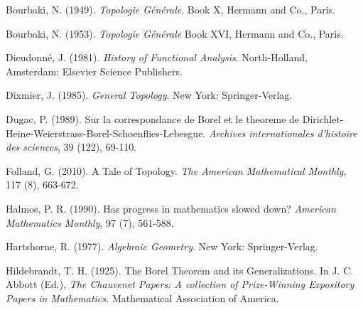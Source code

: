 \documentclass[12pt]{article}
\begin{document}
\begin{thebibliography}{99}
 Bourbaki, N. (1949). {\em Topologie G\'{e}n\'{e}rale}. Book X, Hermann and Co., Paris.

 Bourbaki, N. (1953). {\em Topologie G\'{e}n\'{e}rale} Book XVI, Hermann and Co., Paris.


 Dieudonn\'{e}, J. (1981). {\em  History of Functional Analysis}.
North-Holland, Amsterdam: Elsevier Science Publishers.


 Dixmier, J. (1985). {\em General Topology}. New York: Springer-Verlag.

 Dugac, P. (1989). Sur la correspondance de Borel et le theoreme de
Dirichlet-Heine-Weierstrass-Borel-Schoenflies-Lebesgue. {\em Archives internationales
d'histoire des sciences}, 39 (122), 69-110.


 Folland, G. (2010). A Tale of Topology. {\em The American Mathematical Monthly}, 117 (8), 663-672.


 Halmos, P. R. (1990). Has progress in mathematics slowed down?
{\em American Mathematics Monthly}, 97 (7), 561-588.


 Hartshorne, R. (1977). {\em Algebraic Geometry}. New York: Springer-Verlag.


 Hildebrandt, T. H. (1925). The Borel Theorem and its Generalizations.
In J. C. Abbott (Ed.), {\em The Chauvenet Papers:  A collection of Prize-Winning Expository
Papers in Mathematics.} Mathematical Association of America.



\end{thebibliography}
\end{document}
